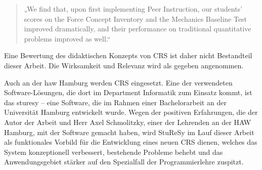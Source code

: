 \begin{quote}
„We find that, upon first implementing Peer Instruction, our students’ scores on the Force Concept Inventory and the Mechanics Baseline Test improved dramatically, and their performance on traditional quantitative problems improved as well.“
\end{quote}


Eine Bewertung des didaktischen Konzepts von CRS ist daher nicht Bestandteil dieser Arbeit. Die Wirksamkeit und Relevanz wird als gegeben angenommen.

Auch an der \ac{haw} Hamburg werden CRS eingesetzt. Eine der verwendeten Software-Lösungen, die dort im Department Informatik zum Einsatz kommt, ist das \ac{sturesy} – eine Software, die im Rahmen einer Bachelorarbeit an der Universität Hamburg entwickelt wurde\cite{sturesy}. Wegen der positiven Erfahrungen, die der Autor der Arbeit und Herr Axel Schmolitzky, einer der Lehrenden an der HAW Hamburg, mit der Software gemacht haben, wird StuReSy im Lauf dieser Arbeit als funktionales Vorbild für die Entwicklung eines neuen CRS dienen, welches das System konzeptionell verbessert, bestehende Probleme behebt und das Anwendungsgebiet stärker auf den Spezialfall der Programmierlehre zuspitzt.